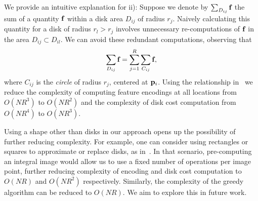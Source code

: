 \documentclass[10pt,twocolumn,letterpaper]{article}
\begin{document}
We provide an intuitive explanation for ii):
Suppose we denote by $\sum_{D_{ij}} \mathbf{f}_{}$ the sum of a quantity $\mathbf{f}_{}$ within a disk area $D_{ij}$ of radius $r_j$.
Naively calculating this quantity for a disk of radius $r_l > r_j$ involves unnecessary re-computations of $\mathbf{f}_{}$
in the area $D_{ij} \subset D_{il}$.
We can avoid these redundant computations, observing that 
\begin{equation}
\sum_{D_{ij}} \mathbf{f}_{} = \sum_{j=1}^R \sum_{C_{ij}} \mathbf{f}_{}, \label{eq:circlesum}
\end{equation}
where $C_{ij}$ is the \emph{circle} of radius $r_j$, centered at $\mathbf{p}_{i}$.
Using the relationship in~ we reduce the complexity of computing feature encodings at all locations from
$O(NR^3)$ to $O(NR^2)$ and the complexity of disk cost computation from $O(NR^4)$ to $O(NR^3)$.

Using a shape other than disks in our approach opens up the possibility of further reducing complexity.
For example, one can consider using rectangles or squares to approximate or replace disks, 
as in~\cite{arbelaez2011contour,tsogkas2012learning}.
In that scenario, pre-computing an integral image would allow us to use a fixed number of operations per image point, further
reducing complexity of encoding and disk cost computation to $O(NR)$ and $O(NR^2)$ respectively.
Similarly, the complexity of the greedy algorithm can be reduced to $O(NR)$.
We aim to explore this in future work.



\end{document}
